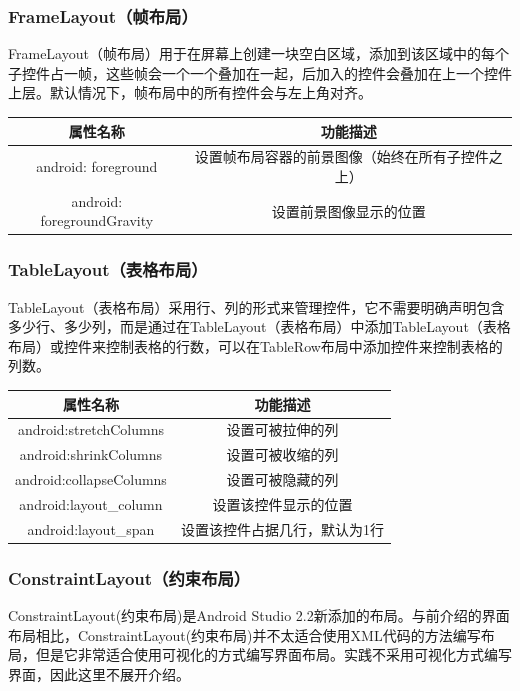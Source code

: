 \documentclass[UTF8,12pt]{article}
\begin{document}
\subsubsection{FrameLayout（帧布局）}
FrameLayout（帧布局）用于在屏幕上创建一块空白区域，添加到该区域中的每个子控件占一帧，这些帧会一个一个叠加在一起，后加入的控件会叠加在上一个控件上层。默认情况下，帧布局中的所有控件会与左上角对齐。

\begin{table}[htbp]
    \centering
    \begin{tabular}{cc}
    \hline
    \textbf{属性名称}              & \textbf{功能描述}            \\ \hline
    android: foreground        & 设置帧布局容器的前景图像（始终在所有子控件之上） \\
    android: foregroundGravity & 设置前景图像显示的位置              \\ \hline
    \end{tabular}
\end{table}

\subsubsection{TableLayout（表格布局）}
TableLayout（表格布局）采用行、列的形式来管理控件，它不需要明确声明包含多少行、多少列，而是通过在TableLayout（表格布局）中添加TableLayout（表格布局）或控件来控制表格的行数，可以在TableRow布局中添加控件来控制表格的列数。

\begin{table}[htbp]
    \centering
    \begin{tabular}{cc}
    \hline
    属性名称                    & 功能描述            \\ \hline
    android:stretchColumns  & 设置可被拉伸的列        \\
    android:shrinkColumns   & 设置可被收缩的列        \\
    android:collapseColumns & 设置可被隐藏的列        \\
    android:layout\_column  & 设置该控件显示的位置      \\
    android:layout\_span    & 设置该控件占据几行，默认为1行 \\ \hline
    \end{tabular}
\end{table}

\subsubsection{ConstraintLayout（约束布局）}
ConstraintLayout(约束布局)是Android Studio 2.2新添加的布局。与前介绍的界面布局相比，ConstraintLayout(约束布局)并不太适合使用XML代码的方法编写布局，但是它非常适合使用可视化的方式编写界面布局。实践不采用可视化方式编写界面，因此这里不展开介绍。
\end{document}
